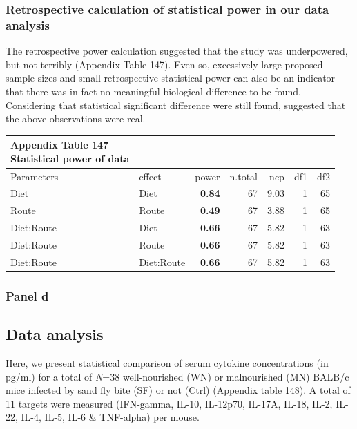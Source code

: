 \documentclass[
  12pt,
  letterpaper,
]{article}
\begin{document}
\subsubsection{Retrospective calculation of statistical power in our data analysis}\label{retrospective-calculation-of-statistical-power-in-our-data-analysis-3}

The retrospective power calculation suggested that the study was underpowered, but not terribly (Appendix Table 147). Even so, excessively large proposed sample sizes and small retrospective statistical power can also be an indicator that there was in fact no meaningful biological difference to be found. Considering that statistical significant difference were still found, suggested that the above observations were real.

\begingroup
\fontsize{12.0pt}{14.4pt}\selectfont
\begin{longtable}{l|lrrrrr}
\caption*{
{\large \textbf{Appendix Table 147}} \\ 
{\small \textbf{Statistical power of data}}
} \\ 
\toprule
Parameters & {effect} & {power} & {n.total} & {ncp} & {df1} & {df2} \\ 
\midrule\addlinespace[2.5pt]
Diet & Diet & {\bfseries 0.84} & 67 & 9.03 & 1 & 65 \\ 
Route & Route & {\bfseries 0.49} & 67 & 3.88 & 1 & 65 \\ 
Diet:Route & Diet & {\bfseries 0.66} & 67 & 5.82 & 1 & 63 \\ 
Diet:Route & Route & {\bfseries 0.66} & 67 & 5.82 & 1 & 63 \\ 
Diet:Route & Diet:Route & {\bfseries 0.66} & 67 & 5.82 & 1 & 63 \\ 
\bottomrule
\end{longtable}
\endgroup

\subsubsection{Panel d}\label{panel-d-2}

\subsection{Data analysis}\label{data-analysis-9}

Here, we present statistical comparison of serum cytokine concentrations (in pg/ml) for a total of \emph{N}=38 well-nourished (WN) or malnourished (MN) BALB/c mice infected by sand fly bite (SF) or not (Ctrl) (Appendix table 148). A total of 11 targets were measured (IFN-gamma, IL-10, IL-12p70, IL-17A, IL-18, IL-2, IL-22, IL-4, IL-5, IL-6 \& TNF-alpha) per mouse.
\end{document}

